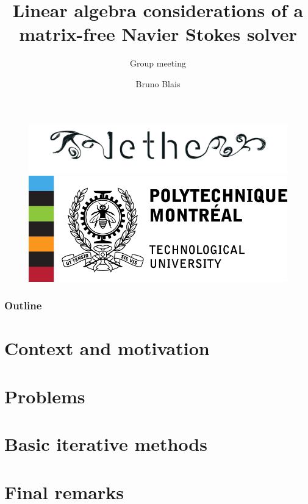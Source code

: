 \documentclass[t, 9pt,xcolor=dvipsnames]{beamer}
\title{\textbf{Linear algebra considerations of a matrix-free Navier Stokes solver}}
\subtitle{Group meeting}
\author{Bruno Blais}
\begin{document}
	\begin{frame}
	\vspace{0.5cm}
		\begin{figure}
	  		\includegraphics[scale = 0.12]{images/logo_lethe.png}\hspace*{0.2cm}
	  		\includegraphics[scale = 0.4]{images/logo-poly.jpg}
		\end{figure}
		\titlepage
	\end{frame}
	
	\begin{frame}
		\frametitle{\textbf{Outline}}
		\tableofcontents
	\end{frame}
	
	\section{Context and motivation}
	
	
	\section{Problems}
	
	
	\section{Basic iterative methods}
	
    	
	\section{Final remarks}
    
	
	
	\nocite{*} %
	    

    \appendix
\end{document}
